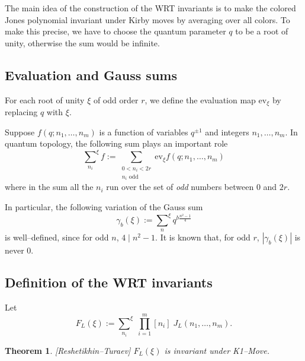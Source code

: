 \documentclass[12pt]{amsart}
\theoremstyle{plain}
\newtheorem{Thm}{Theorem}
\theoremstyle{definition}
\def\ev{\mathrm{ev}}
\begin{document}
The main idea of the construction of the WRT invariants
is to make the colored Jones polynomial invariant under Kirby moves
by  averaging over all colors.
To make this precise, we have to choose the quantum parameter $q$
to be a root of unity, otherwise the sum would be infinite.


\subsection{Evaluation and Gauss sums}
For each root of unity $\xi$ of odd order $r$,
we define the evaluation map
$\ev_\xi$ by replacing $q$ with $\xi$.


Suppose
  $f(q;n_1,\dots,n_m)$ is a function
of variables $q^{\pm 1}$ and integers $n_1,\dots,n_m$.
In quantum topology, the following sum plays an important role
\[
{\sum_{n_i}}^\xi f := \sum_{\substack{0< n_i< 2r\\ n_i \text{ odd}}}
\ev_\xi  f(q; n_1,\dots, n_m)
\]
where in the sum  all the $n_i$ run over the set of {\em odd} numbers
between $0$ and $2r$.

In particular, the following  variation  of the Gauss sum
\[
\gamma_b(\xi):= {\sum_{n}}^\xi q^{b\frac{n^2-1}{4}}
\]
is well--defined, since for odd $n$, $4\mid n^2-1$.
It is known that, for odd $r$, $|\gamma_b(\xi)|$ is never 0.


\subsection{Definition of the WRT invariants}
 Let
\[
 F_{L}(\xi):= {\sum_{n_i}}^\xi\; \prod_{i=1}^m [n_i]\;
  J_{L}(n_1,\dots,n_m).\]


\begin{Thm} \label{K1M}{\rm [Reshetikhin--Turaev]}
$F_L(\xi)$ is invariant under K1--Move.
\end{Thm}

\end{document}
